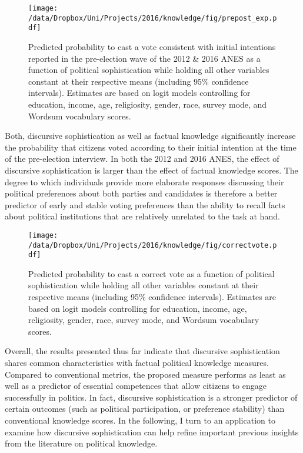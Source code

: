 \begin{figure}[h]\centering
\texttt{[image: /data/Dropbox/Uni/Projects/2016/knowledge/fig/prepost\_exp.pdf]}
\caption{Predicted probability to cast a vote consistent with initial intentions reported in the pre-election wave of the 2012 \& 2016 ANES as a function of political sophistication while holding all other variables constant at their respective means (including 95\% confidence intervals). Estimates are based on logit models controlling for education, income, age, religiosity, gender, race, survey mode, and Wordsum vocabulary scores.}\label{fig:prepost}
\end{figure}

Both, discursive sophistication as well as factual knowledge significantly increase the probability that citizens voted according to their initial intention at the time of the pre-election interview. In both the 2012 and 2016 ANES, the effect of discursive sophistication is larger than the effect of factual knowledge scores. The degree to which individuals provide more elaborate responses discussing their political preferences about both parties and candidates is therefore a better predictor of early and stable voting preferences than the ability to recall facts about political institutions that are relatively unrelated to the task at hand.

\begin{figure}[h]\centering
\texttt{[image: /data/Dropbox/Uni/Projects/2016/knowledge/fig/correctvote.pdf]}
\caption{Predicted probability to cast a correct vote as a function of political sophistication while holding all other variables constant at their respective means (including 95\% confidence intervals). Estimates are based on logit models controlling for education, income, age, religiosity, gender, race, survey mode, and Wordsum vocabulary scores.}\label{fig:correctvote}
\end{figure}


Overall, the results presented thus far indicate that discursive sophistication shares common characteristics with factual political knowledge measures. Compared to conventional metrics, the proposed measure performs as least as well as a predictor of essential competences that allow citizens to engage successfully in politics. In fact, discursive sophistication is a stronger predictor of certain outcomes (such as political participation, or preference stability) than conventional knowledge scores. In the following, I turn to an application to examine how discursive sophistication can help refine important previous insights from the literature on political knowledge.


